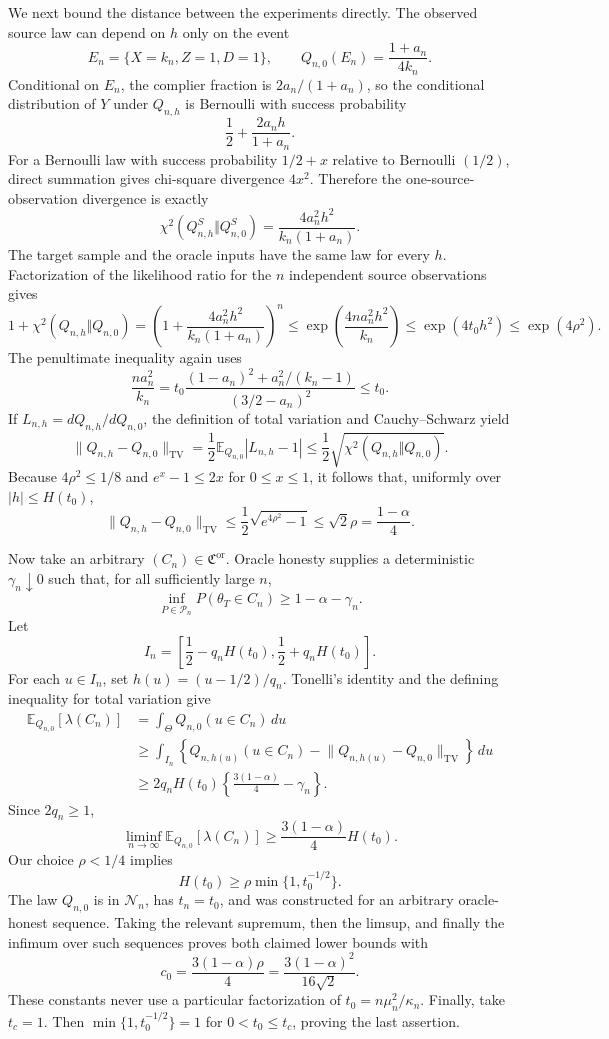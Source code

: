 We next bound the distance between the experiments directly.  The observed source law can depend on \(h\) only on the event
\[
 E_n=\{X=k_n,Z=1,D=1\},\qquad Q_{n,0}(E_n)=\frac{1+a_n}{4k_n}.
\]
Conditional on \(E_n\), the complier fraction is \(2a_n/(1+a_n)\), so the conditional distribution of \(Y\) under \(Q_{n,h}\) is Bernoulli with success probability
\[
 \frac12+\frac{2a_nh}{1+a_n}.
\]
For a Bernoulli law with success probability \(1/2+x\) relative to Bernoulli \((1/2)\), direct summation gives chi-square divergence \(4x^2\).  Therefore the one-source-observation divergence is exactly
\[
 \chi^2(Q_{n,h}^{S}\Vert Q_{n,0}^{S})
 =\frac{4a_n^2h^2}{k_n(1+a_n)}.
\]
The target sample and the oracle inputs have the same law for every \(h\).  Factorization of the likelihood ratio for the \(n\) independent source observations gives
\[
 1+\chi^2(Q_{n,h}\Vert Q_{n,0})
 =\left(1+\frac{4a_n^2h^2}{k_n(1+a_n)}\right)^n
 \le \exp\left(\frac{4na_n^2h^2}{k_n}\right)
 \le \exp(4t_0h^2)
 \le \exp(4\rho^2).
\]
The penultimate inequality again uses
\[
 \frac{na_n^2}{k_n}
 =t_0\frac{(1-a_n)^2+a_n^2/(k_n-1)}{(3/2-a_n)^2}
 \le t_0.
\]
If \(L_{n,h}=dQ_{n,h}/dQ_{n,0}\), the definition of total variation and Cauchy--Schwarz yield
\[
 \lVert Q_{n,h}-Q_{n,0}\rVert_{\mathrm{TV}}
 =\frac12\mathbb E_{Q_{n,0}}|L_{n,h}-1|
 \le\frac12\sqrt{\chi^2(Q_{n,h}\Vert Q_{n,0})}.
\]
Because \(4\rho^2\le1/8\) and \(e^x-1\le2x\) for \(0\le x\le1\), it follows that, uniformly over \(|h|\le H(t_0)\),
\[
 \lVert Q_{n,h}-Q_{n,0}\rVert_{\mathrm{TV}}
 \le\frac12\sqrt{e^{4\rho^2}-1}
 \le\sqrt2\rho=\frac{1-\alpha}{4}.
\]

Now take an arbitrary \((C_n)\in\mathfrak C^{\mathrm{or}}\).  Oracle honesty supplies a deterministic \(\gamma_n\downarrow0\) such that, for all sufficiently large \(n\),
\[
 \inf_{P\in\mathcal P_n}P(\theta_T\in C_n)\ge1-\alpha-\gamma_n.
\]
Let
\[
 I_n=\left[\frac12-q_nH(t_0),\frac12+q_nH(t_0)\right].
\]
For each \(u\in I_n\), set \(h(u)=(u-1/2)/q_n\).  Tonelli's identity and the defining inequality for total variation give
\[
 \begin{aligned}
 \mathbb E_{Q_{n,0}}[\lambda(C_n)]
 &=\int_{\Theta}Q_{n,0}(u\in C_n)\,du\\
 &\ge\int_{I_n}\left\{Q_{n,h(u)}(u\in C_n)-
 \lVert Q_{n,h(u)}-Q_{n,0}\rVert_{\mathrm{TV}}\right\}\,du\\
 &\ge 2q_nH(t_0)\left\{\frac{3(1-\alpha)}4-\gamma_n\right\}.
 \end{aligned}
\]
Since \(2q_n\ge1\),
\[
 \liminf_{n\to\infty}\mathbb E_{Q_{n,0}}[\lambda(C_n)]
 \ge\frac{3(1-\alpha)}4H(t_0).
\]
Our choice \(\rho<1/4\) implies
\[
 H(t_0)\ge \rho\min\{1,t_0^{-1/2}\}.
\]
The law \(Q_{n,0}\) is in \(\mathcal N_n\), has \(t_n=t_0\), and was constructed for an arbitrary oracle-honest sequence.  Taking the relevant supremum, then the limsup, and finally the infimum over such sequences proves both claimed lower bounds with
\[
 c_0=\frac{3(1-\alpha)\rho}{4}
 =\frac{3(1-\alpha)^2}{16\sqrt2}.
\]
These constants never use a particular factorization of \(t_0=n\mu_n^2/\kappa_n\).  Finally, take \(t_c=1\).  Then \(\min\{1,t_0^{-1/2}\}=1\) for \(0<t_0\le t_c\), proving the last assertion.